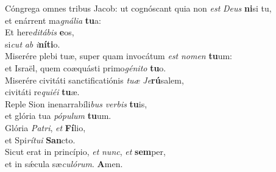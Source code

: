 \evenverse Cóngrega omnes tribus Jacob: ut cognóscant quia non \textit{est} \textit{De}\textit{us} \textbf{ni}si tu,~\*\\
\evenverse et enárrent ma\textit{gná}\textit{li}\textit{a} \textbf{tu}a:\\
\oddverse Et here\textit{di}\textit{tá}\textit{bis} \textbf{e}os,~\*\\
\oddverse si\textit{cut} \textit{ab} \textit{i}\textbf{ní}\textbf{ti}o.\\
\evenverse Miserére plebi tuæ, super quam invocátum \textit{est} \textit{no}\textit{men} \textbf{tu}um:~\*\\
\evenverse et Israël, quem coæquásti primo\textit{gé}\textit{ni}\textit{to} \textbf{tu}o.\\
\oddverse Miserére civitáti sanctificatiónis \textit{tu}\textit{æ} \textit{Je}\textbf{rú}salem,~\*\\
\oddverse civitáti re\textit{qui}\textit{é}\textit{i} \textbf{tu}æ.\\
\evenverse Reple Sion inenarrabíli\textit{bus} \textit{ver}\textit{bis} \textbf{tu}is,~\*\\
\evenverse et glória tua \textit{pó}\textit{pu}\textit{lum} \textbf{tu}um.\\
\oddverse Glória \textit{Pa}\textit{tri}, \textit{et} \textbf{Fí}lio,~\*\\
\oddverse et Spi\textit{rí}\textit{tu}\textit{i} \textbf{San}cto.\\
\evenverse Sicut erat in princípio, \textit{et} \textit{nunc}, \textit{et} \textbf{sem}per,~\*\\
\evenverse et in sǽcula sæ\textit{cu}\textit{ló}\textit{rum}. \textbf{A}men.\\
